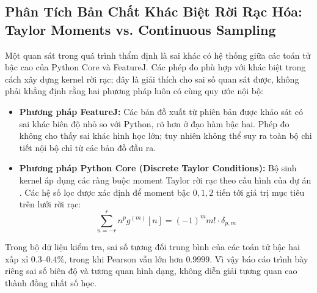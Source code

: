 \documentclass[conference]{IEEEtran}
\begin{document}
\begin{table}[t]
\caption{Ánh xạ tham số dùng trong cấu hình đối chiếu của dự án}
\centering
{}
\label{tab:featurej_mapping}
\end{table}

\subsection{Phân Tích Bản Chất Khác Biệt Rời Rạc Hóa: Taylor Moments vs. Continuous Sampling}
Một quan sát trong quá trình thẩm định là sai khác có hệ thống giữa các toán tử bậc cao của Python Core và FeatureJ. Các phép đo phù hợp với khác biệt trong cách xây dựng kernel rời rạc; đây là giải thích cho sai số quan sát được, không phải khẳng định rằng hai phương pháp luôn có cùng quy ước nội bộ:
\begin{itemize}
    \item \textbf{Phương pháp FeatureJ:} Các bản đồ xuất từ phiên bản được khảo sát có sai khác biên độ nhỏ so với Python, rõ hơn ở đạo hàm bậc hai. Phép đo không cho thấy sai khác hình học lớn; tuy nhiên không thể suy ra toàn bộ chi tiết nội bộ chỉ từ các bản đồ đầu ra.
    \item \textbf{Phương pháp Python Core (Discrete Taylor Conditions):} Bộ sinh kernel áp dụng các ràng buộc moment Taylor rời rạc theo cấu hình của dự án \cite{xlaRepository}. Các hệ số lọc được xác định để moment bậc $0,1,2$ tiến tới giá trị mục tiêu trên lưới rời rạc:
    \begin{equation}
    \sum_{n=-r}^r n^p g^{(m)}[n] = (-1)^m m! \cdot \delta_{p, m}
    \end{equation}
\end{itemize}
Trong bộ dữ liệu kiểm tra, sai số tương đối trung bình của các toán tử bậc hai xấp xỉ $0.3$--$0.4\%$, trong khi Pearson vẫn lớn hơn $0.9999$. Vì vậy báo cáo trình bày riêng sai số biên độ và tương quan hình dạng, không diễn giải tương quan cao thành đồng nhất số học.
\end{document}
